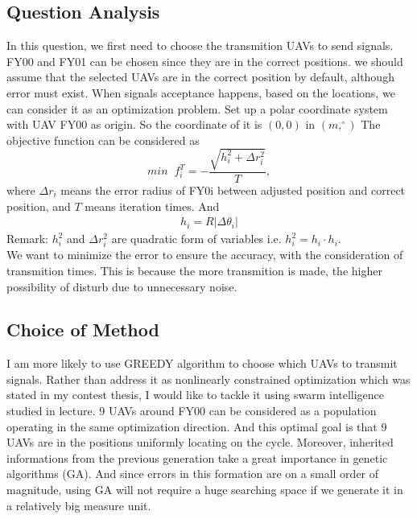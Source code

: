 \documentclass[lang=cn,a4paper,newtx]{elegantpaper}
\begin{document}
\subsection{Question Analysis}
In this question, we first need to choose the transmition UAVs to send signals.
FY00 and FY01 can be chosen since they are in the correct positions.
we should assume that the selected UAVs are in the correct position by default, although error must exist.
When signals acceptance happens, based on the locations, we can consider it as an optimization problem.
Set up a polar coordinate system with UAV FY00 as origin.
So the coordinate of it is $(0,0)$ in $(m,^{\circ})$
The objective function can be considered as 
\[
  min\;\; f_i^T = -\frac{\sqrt{ h_i^2 + \Delta r_i^2}}{T},
  \]
where $\Delta r_i$ means the error radius of FY0i between adjusted position and correct position, and $T$ means iteration times.
And 
\begin{align*}
  h_i = R\lvert \Delta \theta_i \rvert
\end{align*}
Remark: $h_i^2$ and $\Delta r_i^2$ are quadratic form of variables i.e. $h_i^2 = h_i\cdot h_i$.\\
We want to minimize the error to ensure the accuracy, with the consideration of transmition times.
This is because the more transmition is made, the higher possibility of disturb due to unnecessary noise.

\subsection{Choice of Method}
I am more likely to use GREEDY algorithm to choose which UAVs to transmit signals.
Rather than address it as nonlinearly constrained optimization which was stated in my contest thesis,
I would like to tackle it using swarm intelligence studied in lecture.
9 UAVs around FY00 can be considered as a population operating in the same optimization direction.
And this optimal goal is that 9 UAVs are in the positions uniformly locating on the cycle.
Moreover, inherited informations from the previous generation take a great importance in genetic algorithms (GA).
And since errors in this formation are on a small order of magnitude, using GA will not require a huge searching space 
if we generate it in a relatively big measure unit.
\end{document}

